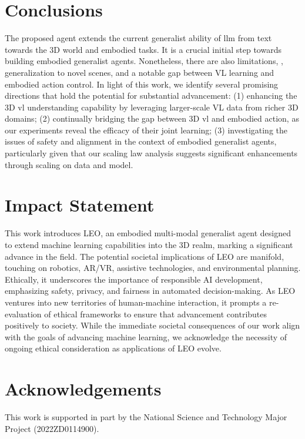 \documentclass{article}
\begin{document}
\section{Conclusions}\label{sec:conclusion}
The proposed agent \agent extends the current generalist ability of \ac{llm} from text towards the 3D world and embodied tasks. It is a crucial initial step towards building embodied generalist agents. Nonetheless, there are also limitations, \eg, generalization to novel scenes, and a notable gap between VL learning and embodied action control. In light of this work, we identify several promising directions that hold the potential for substantial advancement: (1) enhancing the 3D \ac{vl} understanding capability by leveraging larger-scale VL data from richer 3D domains; (2) continually bridging the gap between 3D \ac{vl} and embodied action, as our experiments reveal the efficacy of their joint learning; (3) investigating the issues of safety and alignment in the context of embodied generalist agents, particularly given that our scaling law analysis suggests significant enhancements through scaling on data and model.

\section*{Impact Statement}
This work introduces LEO, an embodied multi-modal generalist agent designed to extend machine learning capabilities into the 3D realm, marking a significant advance in the field. The potential societal implications of LEO are manifold, touching on robotics, AR/VR, assistive technologies, and environmental planning. Ethically, it underscores the importance of responsible AI development, emphasizing safety, privacy, and fairness in automated decision-making. As LEO ventures into new territories of human-machine interaction, it prompts a re-evaluation of ethical frameworks to ensure that advancement contributes positively to society. While the immediate societal consequences of our work align with the goals of advancing machine learning, we acknowledge the necessity of ongoing ethical consideration as applications of LEO evolve.


\section*{Acknowledgements}
This work is supported in part by the National Science and Technology Major Project (2022ZD0114900).





\clearpage
\onecolumn
\appendix

\end{document}
